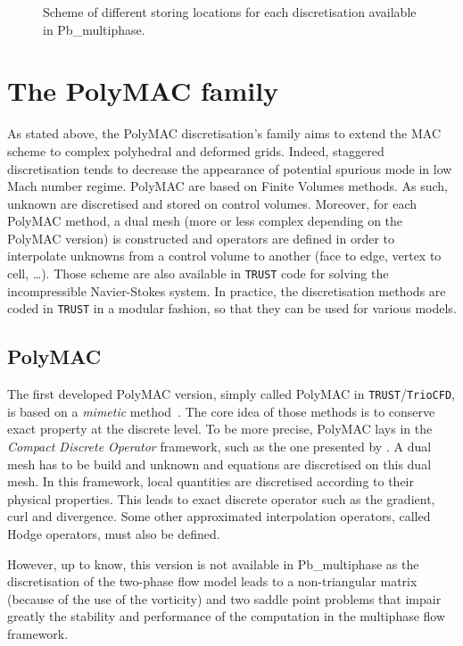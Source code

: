 \begin{figure}[htbp]
\begin{subfigure}[b]{0.45\textwidth}
    \label{PolyVEF}
  \end{subfigure}
  \caption{Scheme of different storing locations for each discretisation available in Pb\_multiphase.}
  \label{Spatialdiscretisation}
\end{figure}

\section{The PolyMAC family\label{sec:polymac-family}}
As stated above, the PolyMAC discretisation's family aims to extend the MAC scheme to complex polyhedral and deformed grids. Indeed, staggered discretisation tends to decrease the appearance of potential spurious mode in low Mach number regime. PolyMAC are based on Finite Volumes methods. As such, unknown are discretised and stored on control volumes. Moreover, for each PolyMAC method, a dual mesh (more or less complex depending on the PolyMAC version) is constructed and operators are defined in order to interpolate unknowns from a control volume to another (face to edge, vertex to cell, \ldots). Those scheme are also available in \texttt{TRUST} code for solving the incompressible Navier-Stokes system. In practice, the discretisation methods are coded in \texttt{TRUST} in a modular fashion, so that they can be used for various models. 

\subsection{PolyMAC}
The first developed PolyMAC version, simply called PolyMAC in \texttt{TRUST}/\texttt{TrioCFD}, is based on a \textit{mimetic} method~\cite{lipnikov2014mimetic}. The core idea of those methods is to conserve exact property at the discrete level. To be more precise, PolyMAC lays in the \textit{Compact Discrete Operator} framework, such as the one presented by \textcite{bonelle2014,milani2020}. A dual mesh has to be build and unknown and equations are discretised on this dual mesh. In this framework, local quantities are discretised according to their physical properties. This leads to exact discrete operator such as the gradient, curl and divergence. Some other approximated interpolation operators, called Hodge operators, must also be defined.

However, up to know, this version is not available in Pb\_multiphase as the discretisation of the two-phase flow model leads to a non-triangular matrix (because of the use of the vorticity) and two saddle point problems that impair greatly the stability and performance of the computation in the multiphase flow framework. 

